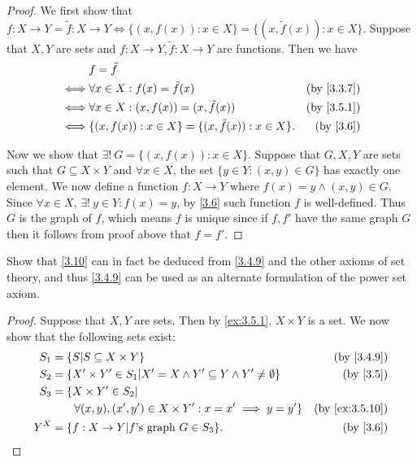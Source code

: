 \begin{proof}
  We first show that \(f : X \to Y = \tilde{f} : X \to Y \iff \{(x, f(x)) : x \in X\} = \{(x, \tilde{f}(x)) : x \in X\}\).
  Suppose that \(X, Y\) are sets and \(f : X \to Y, \tilde{f} : X \to Y\) are functions.
  Then we have
  \begin{align*}
         & f = \tilde{f}                                                                         \\
    \iff & \forall x \in X : f(x) = \tilde{f}(x)                      & \text{(by \cref{3.3.7})} \\
    \iff & \forall x \in X : (x, f(x)) = (x, \tilde{f}(x))            & \text{(by \cref{3.5.1})} \\
    \iff & \{(x, f(x)) : x \in X\} = \{(x, \tilde{f}(x)) : x \in X\}. & \text{(by \cref{3.6})}
  \end{align*}

  Now we show that \(\exists!\ G = \{(x, f(x)) : x \in X\}\).
  Suppose that \(G, X, Y\) are sets such that \(G \subseteq X \times Y\) and \(\forall x \in X\), the set \(\{y \in Y : (x, y) \in G\}\) has exactly one element.
  We now define a function \(f : X \to Y\) where \(f(x) = y \land (x, y) \in G\).
  Since \(\forall x \in X\), \(\exists!\ y \in Y : f(x) = y\), by \cref{3.6} such function \(f\) is well-defined.
  Thus \(G\) is the graph of \(f\), which means \(f\) is unique since if \(f, f'\) have the same graph \(G\) then it follows from proof above that \(f = f'\).
\end{proof}

\begin{ex}\label{ex:3.5.11}
  Show that \cref{3.10} can in fact be deduced from \cref{3.4.9} and the other axioms of set theory, and thus \cref{3.4.9} can be used as an alternate formulation of the power set axiom.
\end{ex}

\begin{proof}
  Suppose that \(X, Y\) are sets.
  Then by \cref{ex:3.5.1}, \(X \times Y\) is a set.
  We now show that the following sets exist:
  \begin{align*}
    S_1 & = \{S | S \subseteq X \times Y\}                                                 & \text{(by \cref{3.4.9})}     \\
    S_2 & = \{X' \times Y' \in S_1 | X' = X \land Y' \subseteq Y \land Y' \neq \emptyset\} & \text{(by \cref{3.5})}       \\
    S_3 & = \{X \times Y' \in S_2 |                                                                                       \\
        & \quad\quad \forall (x, y), (x', y') \in X \times Y' : x = x' \implies y = y'\}   & \text{(by \cref{ex:3.5.10})} \\
    Y^X & = \{f : X \to Y | f \text{'s graph } G \in S_3\}.                                & \text{(by \cref{3.6})}
  \end{align*}
\end{proof}

